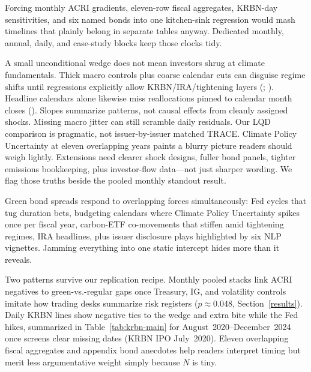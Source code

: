 \documentclass[
  11pt,
]{article}
\makeatletter
\renewcommand{\section}{\@startsection{section}{1}{\z@}{-2.0ex \@plus -0.5ex \@minus -.2ex}{0.8ex \@plus.2ex}{\normalfont\Large\bfseries\color{TitleBlue}}}
\makeatother
\begin{document}
Forcing monthly ACRI gradients, eleven-row fiscal aggregates, KRBN-day sensitivities, and six named bonds into one kitchen-sink regression would mash timelines that plainly belong in separate tables anyway. Dedicated monthly, annual, daily, and case-study blocks keep those clocks tidy.

A small unconditional wedge does not mean investors shrug at climate fundamentals. Thick macro controls plus coarse calendar cuts can disguise regime shifts until regressions explicitly allow KRBN/IRA/tightening layers (; ). Headline calendars alone likewise miss reallocations pinned to calendar month closes (). Slopes summarize patterns, not causal effects from cleanly assigned shocks. Missing macro jitter can still scramble daily residuals. Our LQD comparison is pragmatic, not issuer-by-issuer matched TRACE. Climate Policy Uncertainty at eleven overlapping years paints a blurry picture readers should weigh lightly. Extensions need clearer shock designs, fuller bond panels, tighter emissions bookkeeping, plus investor-flow data—not just sharper wording. We flag those truths beside the pooled monthly standout result.

\section{Conclusion}\label{conclusion}

Green bond spreads respond to overlapping forces simultaneously: Fed cycles that tug duration bets, budgeting calendars where Climate Policy Uncertainty spikes once per fiscal year, carbon-ETF co-movements that stiffen amid tightening regimes, IRA headlines, plus issuer disclosure plays highlighted by six NLP vignettes. Jamming everything into one static intercept hides more than it reveals.

Two patterns survive our replication recipe. Monthly pooled stacks link ACRI negatives to green-vs.-regular gaps once Treasury, IG, and volatility controls imitate how trading desks summarize risk registers ($p \approx 0.048$, Section~\ref{results}). Daily KRBN lines show negative ties to the wedge and extra bite while the Fed hikes, summarized in Table~\ref{tab:krbn-main} for August~2020--December~2024 once screens clear missing dates (KRBN IPO July~2020). Eleven overlapping fiscal aggregates and appendix bond anecdotes help readers interpret timing but merit less argumentative weight simply because \(N\) is tiny.
\end{document}
